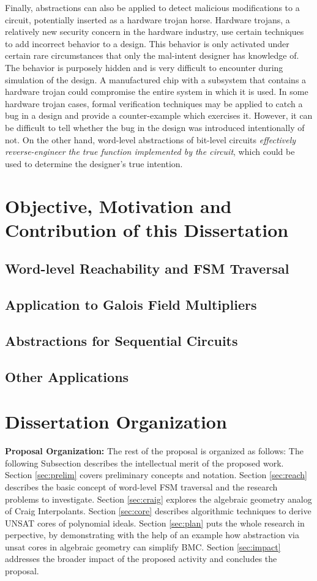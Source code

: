 Finally, abstractions can also be applied to detect malicious 
modifications to a circuit, potentially inserted as a hardware trojan horse.
Hardware trojans, a relatively new security concern in the hardware 
industry, use certain techniques to add incorrect behavior to a 
design. 
This behavior is only activated under certain rare circumstances that only 
the mal-intent designer has knowledge of.
The behavior is purposely hidden and is very difficult to encounter during 
simulation of the design. A manufactured chip with a subsystem 
that contains a hardware trojan could compromise the entire system in which 
it is used.
In some hardware trojan cases, formal verification techniques may be applied 
to catch a bug in a design and provide a counter-example which exercises it. 
However, it can be difficult to tell whether the bug in the design was 
introduced intentionally of not. On the other hand, word-level abstractions 
of bit-level circuits {\it effectively reverse-engineer the true function 
implemented by the circuit}, which could be used to determine the designer's 
true intention.


\section{Objective, Motivation and Contribution of this Dissertation}
\subsection{Word-level Reachability and FSM Traversal}
\subsection{Application to Galois Field Multipliers}
\subsection{Abstractions for Sequential Circuits}
\subsection{Other Applications}

\section{Dissertation Organization}
{\bf Proposal Organization:} The rest of the proposal is organized as
follows: The following Subsection describes the intellectual merit of
the proposed work.  Section \ref{sec:prelim} covers preliminary
concepts and notation. Section \ref{sec:reach} describes the basic
concept of word-level FSM traversal and the research problems to
investigate. Section \ref{sec:craig} explores the algebraic geometry
analog of Craig Interpolants. Section \ref{sec:core} describes
algorithmic techniques to derive UNSAT cores of polynomial
ideals. Section \ref{sec:plan} puts the whole research in perpective,
by demonstrating  with the help of an example how abstraction via
unsat cores in algebraic geometry can simplify BMC. 
Section \ref{sec:impact} addresses the broader impact of the
proposed activity and concludes the proposal.